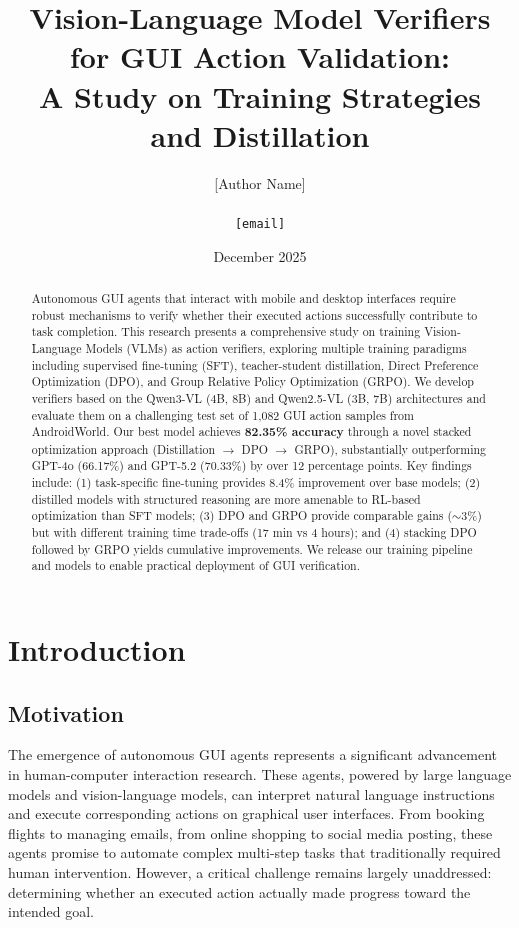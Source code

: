 \documentclass[11pt,a4paper]{article}
\title{\textbf{Vision-Language Model Verifiers for GUI Action Validation: \\
A Study on Training Strategies and Distillation}}
\author{
    [Author Name] \\
    [Affiliation] \\
    \texttt{[email]}
}
\date{December 2025}
\begin{document}
\maketitle

\begin{abstract}
Autonomous GUI agents that interact with mobile and desktop interfaces require robust mechanisms to verify whether their executed actions successfully contribute to task completion. This research presents a comprehensive study on training Vision-Language Models (VLMs) as action verifiers, exploring multiple training paradigms including supervised fine-tuning (SFT), teacher-student distillation, Direct Preference Optimization (DPO), and Group Relative Policy Optimization (GRPO). We develop verifiers based on the Qwen3-VL (4B, 8B) and Qwen2.5-VL (3B, 7B) architectures and evaluate them on a challenging test set of 1,082 GUI action samples from AndroidWorld. Our best model achieves \textbf{82.35\% accuracy} through a novel stacked optimization approach (Distillation $\rightarrow$ DPO $\rightarrow$ GRPO), substantially outperforming GPT-4o (66.17\%) and GPT-5.2 (70.33\%) by over 12 percentage points. Key findings include: (1) task-specific fine-tuning provides 8.4\% improvement over base models; (2) distilled models with structured reasoning are more amenable to RL-based optimization than SFT models; (3) DPO and GRPO provide comparable gains ($\sim$3\%) but with different training time trade-offs (17 min vs 4 hours); and (4) stacking DPO followed by GRPO yields cumulative improvements. We release our training pipeline and models to enable practical deployment of GUI verification.
\end{abstract}

\section{Introduction}

\subsection{Motivation}

The emergence of autonomous GUI agents represents a significant advancement in human-computer interaction research. These agents, powered by large language models and vision-language models, can interpret natural language instructions and execute corresponding actions on graphical user interfaces. From booking flights to managing emails, from online shopping to social media posting, these agents promise to automate complex multi-step tasks that traditionally required human intervention. However, a critical challenge remains largely unaddressed: determining whether an executed action actually made progress toward the intended goal.
\end{document}
